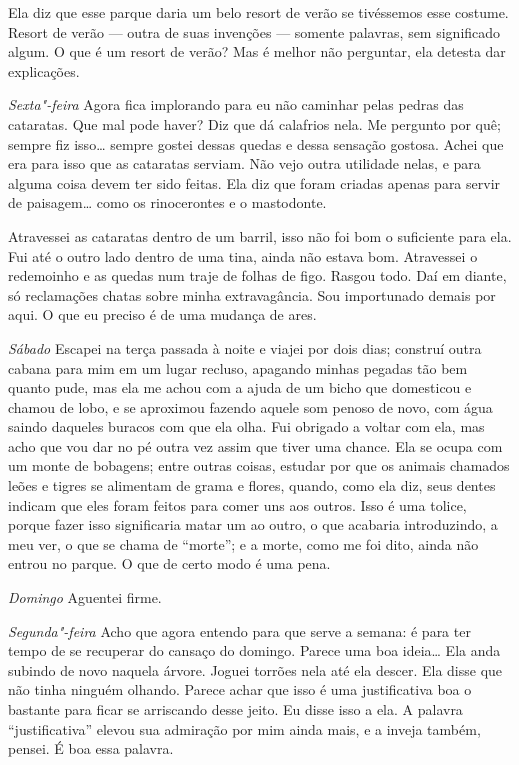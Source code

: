 Ela diz que esse parque daria um belo resort de verão se tivéssemos esse
costume. Resort de verão --- outra de suas invenções --- somente palavras, sem
significado algum. O que é um resort de verão? Mas é melhor não perguntar, 
ela detesta dar explicações.

\textit{Sexta"-feira}  Agora fica implorando para eu não caminhar pelas pedras das
cataratas. Que mal pode haver? Diz que dá calafrios nela. Me pergunto por quê;
sempre fiz isso\ldots{} sempre gostei dessas quedas e dessa sensação gostosa. Achei
que era para isso que as cataratas serviam. Não vejo outra utilidade nelas, e
para alguma coisa devem ter sido feitas. Ela diz que foram criadas apenas para
servir de paisagem\ldots{} como os rinocerontes e o mastodonte. 

Atravessei as cataratas dentro de um barril, isso não foi bom o suficiente para
ela. Fui até o outro lado dentro de uma tina, ainda não estava bom.
Atravessei o redemoinho e as quedas num traje de folhas de figo. Rasgou todo.
Daí em diante, só reclamações chatas sobre minha extravagância. 
Sou importunado demais por aqui. O que eu preciso é de uma mudança de ares.

\textit{Sábado}  Escapei na terça passada à noite e viajei por dois dias; construí outra
cabana para mim em um lugar recluso, apagando minhas pegadas tão bem quanto
pude, mas ela me achou com a ajuda de um bicho que domesticou e chamou de
lobo, e se aproximou fazendo aquele som penoso de novo, com água saindo
daqueles buracos com que ela olha. Fui obrigado a voltar com ela, mas acho que
vou dar no pé outra vez assim que tiver uma chance. Ela se ocupa com um monte de
bobagens; entre outras coisas, estudar por que os animais chamados leões e tigres se
alimentam de grama e flores, quando, como ela diz, seus dentes indicam que
eles foram feitos para comer uns aos outros. Isso é uma tolice, porque fazer
isso significaria matar um ao outro, o que acabaria introduzindo, a meu ver, o
que se chama de “morte”; e a morte, como me foi dito, ainda não entrou no
parque. O que de certo modo é uma pena. 

\textit{Domingo}   Aguentei firme. 

\textit{Segunda"-feira}   Acho que agora entendo para que serve a semana: é para ter tempo
de se recuperar do cansaço do domingo. Parece uma boa ideia\ldots{} Ela anda
subindo de novo naquela árvore. Joguei torrões nela até ela descer.
Ela disse que não tinha ninguém olhando. Parece achar que isso é uma justificativa boa
o bastante para ficar se arriscando desse jeito. Eu disse isso a ela. A palavra
``justificativa'' elevou sua admiração por mim  ainda mais, e a inveja também,
pensei. É boa essa palavra.

